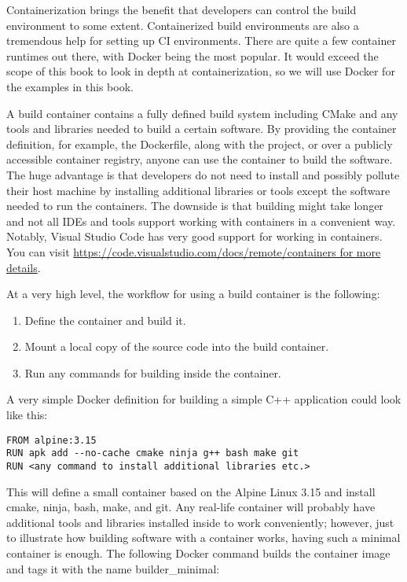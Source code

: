 Containerization brings the benefit that developers can control the build environment to some extent. Containerized build environments are also a tremendous help for setting up CI environments. There are quite a few container runtimes out there, with Docker being the most popular. It would exceed the scope of this book to look in depth at containerization, so we will use Docker for the examples in this book.

A build container contains a fully defined build system including CMake and any tools and libraries needed to build a certain software. By providing the container definition, for example, the Dockerfile, along with the project, or over a publicly accessible container registry, anyone can use the container to build the software. The huge advantage is that developers do not need to install and possibly pollute their host machine by installing additional libraries or tools except the software needed to run the containers. The downside is that building might take longer and not all IDEs and tools support working with containers in a convenient way. Notably, Visual Studio Code has very good support for working in containers. You can visit \url{https://code.visualstudio.com/docs/remote/containers for more details}.

At a very high level, the workflow for using a build container is the following:

\begin{enumerate}
\item 
Define the container and build it.

\item 
Mount a local copy of the source code into the build container.

\item 
Run any commands for building inside the container.
\end{enumerate}

A very simple Docker definition for building a simple C++ application could look like this:

\begin{lstlisting}[style=styleCMake]
FROM alpine:3.15
RUN apk add --no-cache cmake ninja g++ bash make git
RUN <any command to install additional libraries etc.>
\end{lstlisting}

This will define a small container based on the Alpine Linux 3.15 and install cmake, ninja, bash, make, and git. Any real-life container will probably have additional tools and libraries installed inside to work conveniently; however, just to illustrate how building software with a container works, having such a minimal container is enough. The following Docker command builds the container image and tags it with the name builder\_minimal:

